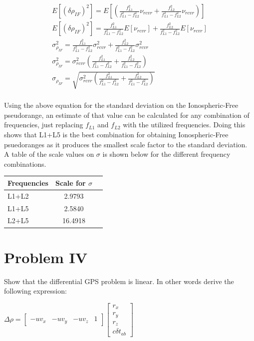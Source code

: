\documentclass{article}
\begin{document}
\begin{gather*}
    E \left[(\delta\rho_{IF})^2\right] = E \left[(\frac{f_{L1}^2}{f_{L1}^2 - f_{L2}^2}\nu_{rcvr} + \frac{f_{L2}^2}{f_{L1}^2 - f_{L2}^2}\nu_{rcvr})\right]\\
    E \left[(\delta\rho_{IF})^2\right] = \frac{f_{L1}^2}{f_{L1}^2 - f_{L2}^2}E \left[\nu_{rcvr}\right] + \frac{f_{L2}^2}{f_{L1}^2 - f_{L2}^2}E \left[\nu_{rcvr}\right]\\
    \sigma_{\rho_{IF}}^2 =  \frac{f_{L1}^2}{f_{L1}^2 - f_{L2}^2}\sigma_{rcvr}^2 + \frac{f_{L2}^2}{f_{L1}^2 - f_{L2}^2}\sigma_{rcvr}^2\\
    \sigma_{\rho_{IF}}^2 =  \sigma_{rcvr}^2(\frac{f_{L1}^2}{f_{L1}^2 - f_{L2}^2} + \frac{f_{L2}^2}{f_{L1}^2 - f_{L2}^2})\\
    \sigma_{\rho_{IF}} =  \sqrt{\sigma_{rcvr}^2(\frac{f_{L1}^2}{f_{L1}^2 - f_{L2}^2} + \frac{f_{L2}^2}{f_{L1}^2 - f_{L2}^2})}\\
\end{gather*}

Using the above equation for the standard deviation on the Ionospheric-Free pseudorange, an estimate of that value can be calculated for any combination of frequencies, 
just replacing $f_{L1}$ and $f_{L2}$ with the utilized frequencies.  Doing this shows that L1+L5 is the best combination for obtaining Ionospheric-Free psuedoranges as it 
produces the smallest scale factor to the standard deviation.\\
A table of the scale values on $\sigma$ is shown below for the different frequency combinations.

\begin{center}
    \begin{tabular}{ | l | c | r }
      \hline
      Frequencies & Scale for $\sigma$ \\ \hline
      L1+L2 & 2.9793 \\ \hline
      L1+L5 & 2.5840 \\ \hline
      L2+L5 & 16.4918 \\ \hline
    \end{tabular}
  \end{center}

\section*{Problem IV}
Show that the differential GPS problem is linear. In other words derive the following
expression:
    \begin{center}
    $\Delta\rho=\begin{bmatrix}
        -uv_x & -uv_y & -uv_z & 1
        \end{bmatrix}\begin{bmatrix}
        r_x\\r_y\\r_z\\c\delta t_{ab}
        \end{bmatrix}$
    \end{center}
\end{document}

